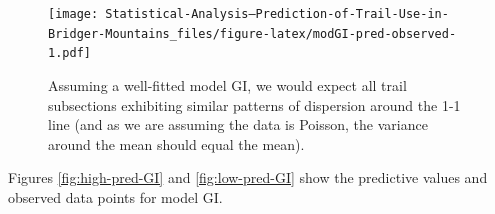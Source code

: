 \documentclass[
]{book}
\newenvironment{Shaded}{\begin{snugshade}}{\end{snugshade}}
\newcommand{\AttributeTok}[1]{\textcolor[rgb]{0.77,0.63,0.00}{#1}}
\newcommand{\CommentTok}[1]{\textcolor[rgb]{0.56,0.35,0.01}{\textit{#1}}}
\newcommand{\DecValTok}[1]{\textcolor[rgb]{0.00,0.00,0.81}{#1}}
\newcommand{\FloatTok}[1]{\textcolor[rgb]{0.00,0.00,0.81}{#1}}
\newcommand{\FunctionTok}[1]{\textcolor[rgb]{0.00,0.00,0.00}{#1}}
\newcommand{\NormalTok}[1]{#1}
\newcommand{\OtherTok}[1]{\textcolor[rgb]{0.56,0.35,0.01}{#1}}
\newcommand{\SpecialCharTok}[1]{\textcolor[rgb]{0.00,0.00,0.00}{#1}}
\newcommand{\StringTok}[1]{\textcolor[rgb]{0.31,0.60,0.02}{#1}}
\begin{document}
\begin{Shaded}
\end{Shaded}

\begin{figure}
\centering
\texttt{[image: Statistical-Analysis--Prediction-of-Trail-Use-in-Bridger-Mountains\_files/figure-latex/modGI-pred-observed-1.pdf]}
\caption{\label{fig:modGI-pred-observed}Assuming a well-fitted model GI, we would expect all trail subsections exhibiting similar patterns of dispersion around the 1-1 line (and as we are assuming the data is Poisson, the variance around the mean should equal the mean).}
\end{figure}

Figures \ref{fig:high-pred-GI} and \ref{fig:low-pred-GI} show the predictive values and observed data points for model GI.
\end{document}
